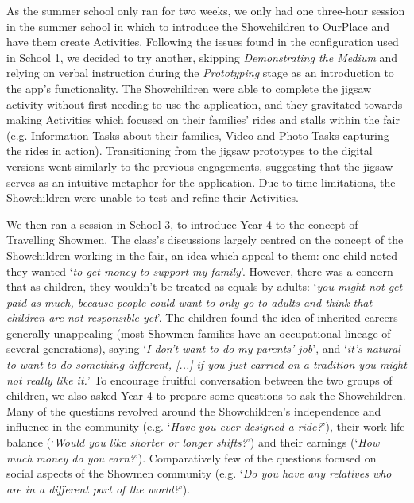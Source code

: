 As the summer school only ran for two weeks, we only had one three-hour session in the summer school in which to introduce the Showchildren to OurPlace and have them create Activities. Following the issues found in the configuration used in School 1, we decided to try another, skipping \textit{Demonstrating the Medium} and relying on verbal instruction during the \textit{Prototyping} stage as an introduction to the app's functionality. The Showchildren were able to complete the jigsaw activity without first needing to use the application, and they gravitated towards making Activities which focused on their families' rides and stalls within the fair (e.g. Information Tasks about their families, Video and Photo Tasks capturing the rides in action). Transitioning from the jigsaw prototypes to the digital versions went similarly to the previous engagements, suggesting that the jigsaw serves as an intuitive metaphor for the application. Due to time limitations, the Showchildren were unable to test and refine their Activities.

We then ran a session in School 3, to introduce Year 4 to the concept of Travelling Showmen. The class's discussions largely centred on the concept of the Showchildren working in the fair, an idea which appeal to them: one child noted they wanted `\textit{to get money to support my family}'. However, there was a concern that as children, they wouldn't be treated as equals by adults: `\textit{you might not get paid as much, because people could want to only go to adults and think that children are not responsible yet}'. The children found the idea of inherited careers generally unappealing (most Showmen families have an occupational lineage of several generations), saying `\textit{I don't want to do my parents' job}', and `\textit{it's natural to want to do something different, [...] if you just carried on a tradition you might not really like it.}' To encourage fruitful conversation between the two groups of children, we also asked Year 4 to prepare some questions to ask the Showchildren. Many of the questions revolved around the Showchildren's independence and influence in the community (e.g. `\textit{Have you ever designed a ride?}'), their work-life balance (`\textit{Would you like shorter or longer shifts?}') and their earnings (`\textit{How much money do you earn?}'). Comparatively few of the questions focused on social aspects of the Showmen community (e.g. `\textit{Do you have any relatives who are in a different part of the world?}').

